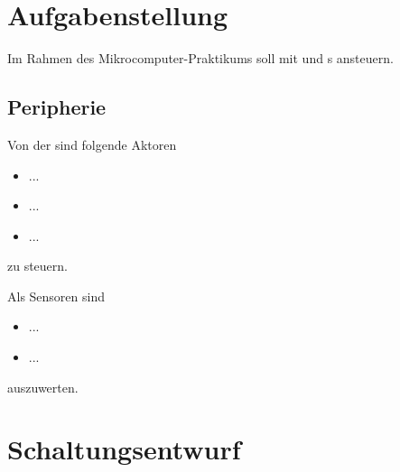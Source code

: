 \documentclass[12pt,fleqn,parskip=half,twoside,toc=index,headings=small,a4paper]{scrreprt}
\begin{document}
	
	\tableofcontents
	\raggedbottom
	\chapter{Aufgabenstellung}
	Im Rahmen des Mikrocomputer-Praktikums soll mit  und s ansteuern.
%	
	\section{Peripherie}
	Von der  sind folgende Aktoren
	\begin{itemize}[noitemsep]
		\item ...
		\item ...
		\item ...
	\end{itemize}
	zu steuern.
	
	Als Sensoren sind
	\begin{itemize}[noitemsep]
		\item ...
		\item ...
	\end{itemize}
	auszuwerten.
	\chapter{Schaltungsentwurf}
\end{document}
